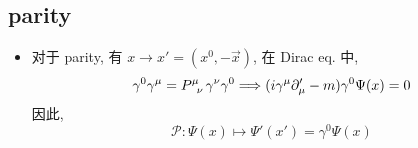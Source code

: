 
\subsection{parity}
\begin{itemize}
	\item 对于 parity, 有 $x \rightarrow x' = (x^0, - \vec{x})$, 在 Dirac eq. 中,
	\begin{equation}
		\gamma^0 \gamma^\mu = \tensor{P}{^\mu_\nu} \gamma^\nu \gamma^0 \Longrightarrow (i \gamma^\mu \partial'_\mu - m) \gamma^0 \Psi(x) = 0
	\end{equation}
	因此,
	\begin{equation}
		\mathcal{P} : \Psi(x) \mapsto \Psi'(x') = \gamma^0 \Psi(x)
	\end{equation}
\end{itemize}


